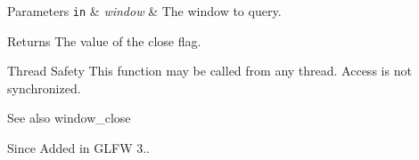 \begin{DoxyParams}[1]{Parameters}
\mbox{\tt in}  & {\em window} & The window to query. \\
\hline
\end{DoxyParams}
\begin{DoxyReturn}{Returns}
The value of the close flag.
\end{DoxyReturn}
\begin{DoxyParagraph}{Thread Safety}
This function may be called from any thread. Access is not synchronized.
\end{DoxyParagraph}
\begin{DoxySeeAlso}{See also}
window\+\_\+close
\end{DoxySeeAlso}
\begin{DoxySince}{Since}
Added in G\+L\+F\+W 3.. 
\end{DoxySince}
